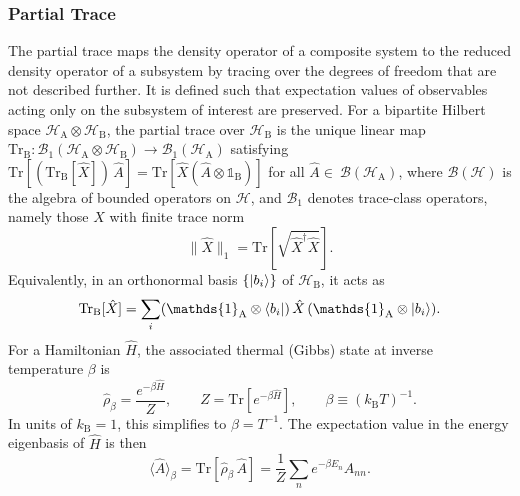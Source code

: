 \subsubsection{Partial Trace}
The partial trace maps the density operator of a composite system to the reduced density operator of a subsystem by tracing over the degrees of freedom that are not described further. It is defined such that expectation values of observables acting only on the subsystem of interest are preserved.
For a bipartite Hilbert space $\mathcal{H}_{\mathrm{A}} \otimes \mathcal{H}_{\mathrm{B}}$, the partial trace over $\mathcal{H}_{\mathrm{B}}$ is the unique linear map $\mathrm{Tr}_{\mathrm{B}}: \mathcal{B}_1(\mathcal{H}_{\mathrm{A}} \otimes \mathcal{H}_{\mathrm{B}}) \to \mathcal{B}_1(\mathcal{H}_{\mathrm{A}})$ satisfying $\mathrm{Tr}[(\mathrm{Tr}_{\mathrm{B}} [\hat{X}])\, \hat{A}] = \mathrm{Tr}[\hat{X} (\hat{A} \otimes \mathds{1}_{\mathrm{B}})]$ for all $\hat{A} \in~\mathcal{B}(\mathcal{H}_{\mathrm{A}})$, where $\mathcal{B}(\mathcal{H})$ is the algebra of bounded operators on $\mathcal{H}$, and $\mathcal{B}_1$ denotes trace-class operators, namely those $X$ with finite trace norm~\cite{reedsimon1972methodsmodernmathematical,breuerpetruccione2007theoryopenquantum}
\begin{equation*}
	\| \hat{X} \|_1 = \mathrm{Tr}\!\left[\sqrt{\hat{X}^\dagger \hat{X}}\right].
\end{equation*}
Equivalently, in an orthonormal basis \(\{\ket{b_i}\}\) of \(\mathcal{H}_{\mathrm{B}}\), it acts as
\begin{equation} \label{eq:oqs_ho_partial_trace_definition}
	\mathrm{Tr}_{\mathrm{B}} [\hat{X}] = \sum_i (\mathds{1}_{\mathrm{A}} \otimes \bra{b_i}) \, \hat{X} \, (\mathds{1}_{\mathrm{A}} \otimes \ket{b_i}).
\end{equation}
For a Hamiltonian \(\hat{H}\), the associated thermal (Gibbs) state at inverse temperature \(\beta\) is
\begin{equation}
	\hat{\rho}_{\beta} = \frac{e^{-\beta \hat{H}}}{Z},
	\qquad
	Z = \mathrm{Tr}[e^{-\beta \hat{H}}],
	\qquad
	\beta \equiv (k_{\mathrm{B}} T)^{-1}.
\label{eq:oqs_gibbs_state_definition}
\end{equation}
In units of \(k_{\mathrm{B}}=1\), this simplifies to \(\beta = T^{-1}\). The expectation value in the energy eigenbasis of \(\hat{H}\) is then
\begin{equation}
	\langle \hat{A} \rangle_{\beta}
	=
	\mathrm{Tr}[\hat{\rho}_{\beta}\, \hat{A}]
	=
	\frac{1}{Z} \sum_n e^{-\beta E_n} A_{nn}.
	\label{eq:oqs_ho_expectation_value}
\end{equation}


